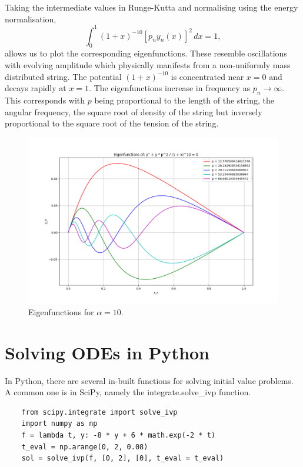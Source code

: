 \documentclass{article}
\begin{document}
Taking the intermediate values in Runge-Kutta and normalising using the energy normalisation,
\[ \int_0^1 (1+x)^{-10}[p_n y_n(x)]^2 \,dx = 1, \]
allows us to plot the corresponding eigenfunctions. These resemble oscillations with evolving amplitude which physically manifests from a non-uniformly mass distributed string. The potential \((1+x)^{-10}\) is concentrated near \(x = 0\) and decays rapidly at \(x=1\). The eigenfunctions increase in frequency as \(p_n \to \infty\). This corresponds with \(p\) being proportional to the length of the string, the angular frequency, the square root of density of the string but inversely proportional to the square root of the tension of the string.
\begin{figure}
    \centering
    \includegraphics[width=1.0\textwidth]{images/non_analytic_eigenfunction.png}
    \caption{Eigenfunctions for \(\alpha = 10\).}
\end{figure}

\section{Solving ODEs in Python}

In Python, there are several in-built functions for solving initial value problems. A common one is in SciPy, namely the integrate.solve\_ivp function.

\begin{verbatim}
    from scipy.integrate import solve_ivp
    import numpy as np
    f = lambda t, y: -8 * y + 6 * math.exp(-2 * t)
    t_eval = np.arange(0, 2, 0.08)
    sol = solve_ivp(f, [0, 2], [0], t_eval = t_eval)
\end{verbatim}
\end{document}
